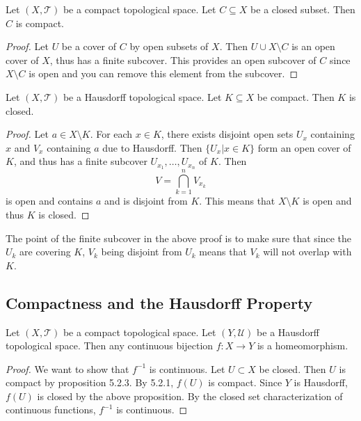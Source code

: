 \documentclass[a4paper]{article}
\begin{document}
\begin{prp}{}{} Let $(X,\mathcal{T})$ be a compact topological space. Let $C\subseteq X$ be a closed subset. Then $C$ is compact. 
\begin{proof}
Let $U$ be a cover of $C$ by open subsets of $X$. Then $U\cup X\setminus C$ is an open cover of $X$, thus has a finite subcover. This provides an open subcover of $C$ since $X\setminus C$ is open and you can remove this element from the subcover. 
\end{proof}
\end{prp}

\begin{prp}{}{} Let $(X,\mathcal{T})$ be a Hausdorff topological space. Let $K\subseteq X$ be compact. Then $K$ is closed. 
\begin{proof}
Let $a\in X\setminus K$. For each $x\in K$, there exists disjoint open sets $U_x$ containing $x$ and $V_x$ containing $a$ due to Hausdorff. Then $\{U_x|x\in K\}$ form an open cover of $K$, and thus has a finite subcover $U_{x_1},\dots,U_{x_n}$ of $K$. Then $$V=\bigcap_{k=1}^nV_{x_k}$$ is open and contains $a$ and is disjoint from $K$. This means that $X\setminus K$ is open and thus $K$ is closed. 
\end{proof}
\end{prp}

The point of the finite subcover in the above proof is to make sure that since the $U_k$ are covering $K$, $V_k$ being disjoint from $U_k$ means that $V_k$ will not overlap with $K$. 

\subsection{Compactness and the Hausdorff Property}
\begin{prp}{}{} Let $(X,\mathcal{T})$ be a compact topological space. Let $(Y,\mathcal{U})$ be a Hausdorff topological space. Then any continuous bijection $f:X\to Y$ is a homeomorphism. 
\begin{proof}
We want to show that $f^{-1}$ is continuous. Let $U\subset X$ be closed. Then $U$ is compact by proposition 5.2.3. By 5.2.1, $f(U)$ is compact. Since $Y$ is Hausdorff, $f(U)$ is closed by the above proposition. By the closed set characterization of continuous functions, $f^{-1}$ is continuous. 
\end{proof}
\end{prp}
\end{document}
